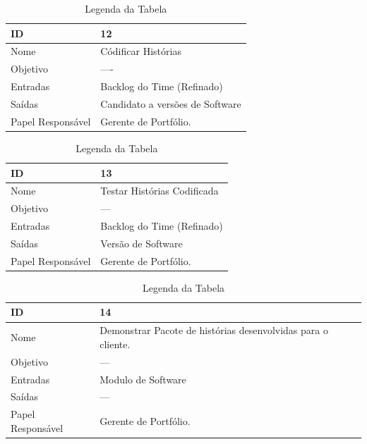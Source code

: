  \begin{table}[H]
    \centering
      \begin{tabular}{| m{5em} | m{10cm} |}
        \hline
        ID       & 12   \\ \hline
        Nome     & Códificar Histórias  \\ \hline
        Objetivo & ----  \\ \hline
        Entradas & Backlog do Time (Refinado)\\ \hline
        Saídas   & Candidato a versões de Software \\ \hline
        Papel Responsável   & Gerente de Portfólio. \\ \hline
      \end{tabular}
      \caption{Legenda da Tabela}
      \label{tabela:atividade12}
  \end{table}

  \begin{table}[H]
    \centering
      \begin{tabular}{| m{5em} | m{10cm} |}
        \hline
        ID       & 13   \\ \hline
        Nome     & Testar Histórias Codificada  \\ \hline
        Objetivo & ---  \\ \hline
        Entradas & Backlog do Time (Refinado)\\ \hline
        Saídas   & Versão de Software \\ \hline
        Papel Responsável   & Gerente de Portfólio. \\ \hline
      \end{tabular}
      \caption{Legenda da Tabela}
      \label{tabela:atividade13}
  \end{table}

  \begin{table}[H]
    \centering
      \begin{tabular}{| m{5em} | m{10cm} |}
        \hline
        ID       & 14   \\ \hline
        Nome     & Demonstrar Pacote de histórias desenvolvidas para o cliente. \\ \hline
        Objetivo & --- \\ \hline
        Entradas & Modulo de Software\\ \hline
        Saídas   &  --- \\ \hline
        Papel Responsável   & Gerente de Portfólio. \\ \hline
      \end{tabular}
      \caption{Legenda da Tabela}
      \label{tabela:atividade14}
  \end{table}

